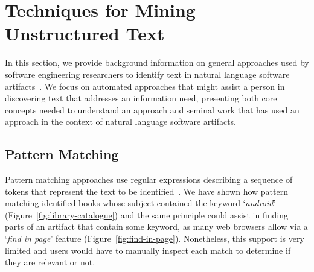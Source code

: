 


\section{Techniques for Mining Unstructured Text}
\label{cp2:general-approaches}




In this section, we provide background information on general 
approaches used
by software engineering researchers 
to identify text in natural language software artifacts~\cite{Bavota2016}.
We focus on 
automated approaches that might assist a person in discovering
text that addresses an information need,
presenting both core concepts needed to understand an approach 
and seminal work that has used an approach in 
the context of natural language software artifacts.







\subsection{Pattern Matching}
\label{cp2:pattern-matching}



Pattern matching approaches use regular expressions describing
a sequence of tokens that represent
the text to be identified~\cite{Bavota2016}. 
We have shown how pattern matching identified
books whose subject contained
the keyword `\textit{android}' (Figure~\ref{fig:library-catalogue})
and the same principle could assist 
in finding parts of an artifact that contain some keyword, 
as many web browsers allow via a `\textit{find in page}' feature (Figure~\ref{fig:find-in-page}).
Nonetheless, this support is very limited and users would have to manually
inspect each match to 
determine if they are relevant or not.






